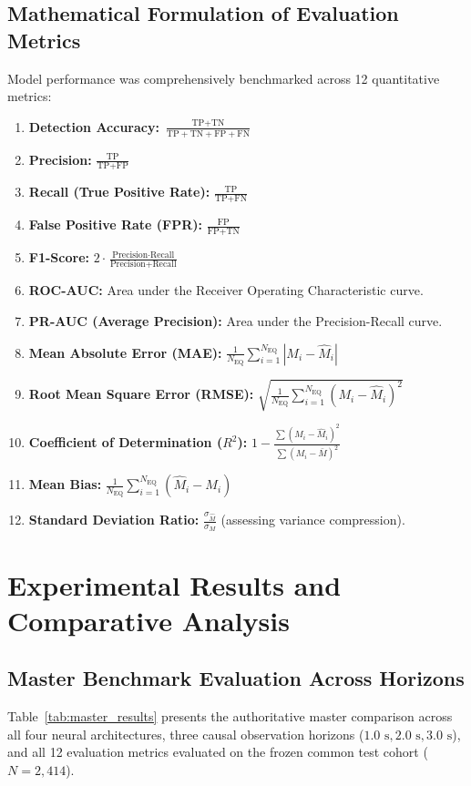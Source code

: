 \documentclass[journal]{IEEEtran}
\begin{document}
\subsection{Mathematical Formulation of Evaluation Metrics}
Model performance was comprehensively benchmarked across 12 quantitative metrics:
\begin{enumerate}
    \item \textbf{Detection Accuracy:} $\frac{\text{TP} + \text{TN}}{\text{TP} + \text{TN} + \text{FP} + \text{FN}}$
    \item \textbf{Precision:} $\frac{\text{TP}}{\text{TP} + \text{FP}}$
    \item \textbf{Recall (True Positive Rate):} $\frac{\text{TP}}{\text{TP} + \text{FN}}$
    \item \textbf{False Positive Rate (FPR):} $\frac{\text{FP}}{\text{FP} + \text{TN}}$
    \item \textbf{F1-Score:} $2 \cdot \frac{\text{Precision} \cdot \text{Recall}}{\text{Precision} + \text{Recall}}$
    \item \textbf{ROC-AUC:} Area under the Receiver Operating Characteristic curve.
    \item \textbf{PR-AUC (Average Precision):} Area under the Precision-Recall curve.
    \item \textbf{Mean Absolute Error (MAE):} $\frac{1}{N_{\text{EQ}}} \sum_{i=1}^{N_{\text{EQ}}} |M_i - \hat{M}_i|$
    \item \textbf{Root Mean Square Error (RMSE):} $\sqrt{\frac{1}{N_{\text{EQ}}} \sum_{i=1}^{N_{\text{EQ}}} (M_i - \hat{M}_i)^2}$
    \item \textbf{Coefficient of Determination ($R^2$):} $1 - \frac{\sum (M_i - \hat{M}_i)^2}{\sum (M_i - \bar{M})^2}$
    \item \textbf{Mean Bias:} $\frac{1}{N_{\text{EQ}}} \sum_{i=1}^{N_{\text{EQ}}} (\hat{M}_i - M_i)$
    \item \textbf{Standard Deviation Ratio:} $\frac{\sigma_{\hat{M}}}{\sigma_M}$ (assessing variance compression).
\end{enumerate}

\section{Experimental Results and Comparative Analysis}

\subsection{Master Benchmark Evaluation Across Horizons}
Table~\ref{tab:master_results} presents the authoritative master comparison across all four neural architectures, three causal observation horizons ($1.0\text{ s}, 2.0\text{ s}, 3.0\text{ s}$), and all 12 evaluation metrics evaluated on the frozen common test cohort ($N = 2,414$).
\end{document}
